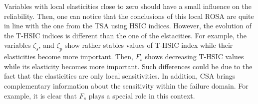Variables with local elasticities close to zero should have a small influence on the reliability. 
Then, one can notice that the conclusions of this local ROSA are quite in line with the one from the TSA using HSIC indices. 
However, the evolution of the T-HSIC indices is different than the one of the elstacities. 
For example, the variables $\zeta_s$, and $\zeta_p$ show rather stables values of T-HSIC index while their elasticities become more important. 
Then, $F_s$ shows decreasing T-HSIC values while its elasticity becomes more important. 
Such differences could be due to the fact that the elasticities are only local sensitivities. 
In addition, CSA brings complementary information about the sensitivity within the failure domain. 
For example, it is clear that $F_s$ plays a special role in this context.


